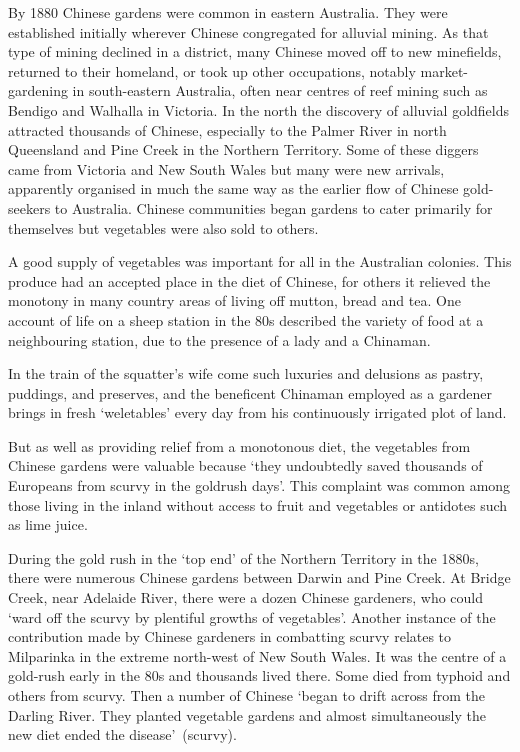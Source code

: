 By 1880 Chinese gardens were common in eastern Australia.  They were
established initially wherever Chinese congregated for alluvial
mining.  As that type of mining declined in a
district, many Chinese moved off to new minefields, returned to their
homeland, or took up other occupations, notably market-gardening in
south-eastern Austra\-lia, often near centres of reef mining
 such as Bendigo  and Walhalla
 in Victoria.  In the north the discovery of alluvial
goldfields attracted thousands of Chinese, especially to the Palmer
River in
 north
Queensland  and Pine Creek  in the
Northern Territory.   Some of these diggers
came from Victoria and New South Wales but many were new arrivals,
apparently organised in much the same way as the earlier flow of
Chinese gold-seekers to Australia.  Chinese communities began gardens
to cater primarily for themselves but vegetables were also sold to
others.

A good supply of vegetables was important for all in the Australian
colonies.  This produce had an accepted place in the diet of Chinese,
for others it relieved the monotony in many country areas of living
off mutton, bread and tea.  One account of life on a sheep station in
the 80s described the variety of food at a neighbouring station, due
to the presence of a lady and a Chinaman.
\begin{Quote}
	In the train of the squatter's wife come such luxuries and
	delusions as pastry, puddings, and preserves, and the
	beneficent Chinaman employed as a gardener brings in fresh
	`weletables' every day from his continuously irrigated plot of
	land.
\end{Quote}
But as well as providing relief from a monotonous diet, the vegetables
from Chinese gardens were valuable because `they undoubtedly saved
thousands of Europeans from scurvy in the goldrush
days'.  This complaint was common among those living in
the inland without access to fruit and vegetables or antidotes such as
lime juice.

During the gold rush in the `top end' of the Northern Territory
 in the
1880s, there were numerous Chinese  gardens between Darwin
 and Pine Creek.  At Bridge Creek,
near Adelaide River,  there were a dozen Chinese
gardeners, who could `ward off the scurvy by plentiful growths of
vegetables'.  Another instance of the contribution made by Chinese
gardeners in combatting scurvy relates to Milparinka
 in the extreme north-west of New South Wales.  It
was the centre of a gold-rush early in the 80s and thousands lived
there.  Some died from typhoid and others from scurvy.  Then a number
of Chinese `began to drift across from the Darling River. They planted
vegetable gardens and almost simultaneously the new diet ended the
disease'~(scurvy).

